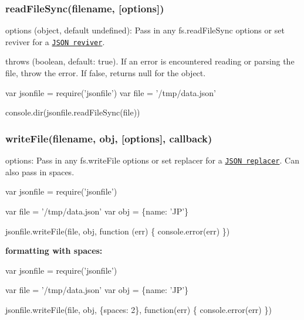 \subsubsection*{read\+File\+Sync(filename, \mbox{[}options\mbox{]})}

{\ttfamily options} ({\ttfamily object}, default {\ttfamily undefined})\+: Pass in any {\ttfamily fs.\+read\+File\+Sync} options or set {\ttfamily reviver} for a \href{https://developer.mozilla.org/en-US/docs/Web/JavaScript/Reference/Global_Objects/JSON/parse}{\tt J\+S\+ON reviver}.
\begin{DoxyItemize}
\item {\ttfamily throws} ({\ttfamily boolean}, default\+: {\ttfamily true}). If an error is encountered reading or parsing the file, throw the error. If {\ttfamily false}, returns {\ttfamily null} for the object.
\end{DoxyItemize}


\begin{DoxyCode}
var jsonfile = require('jsonfile')
var file = '/tmp/data.json'

console.dir(jsonfile.readFileSync(file))
\end{DoxyCode}


\subsubsection*{write\+File(filename, obj, \mbox{[}options\mbox{]}, callback)}

{\ttfamily options}\+: Pass in any {\ttfamily fs.\+write\+File} options or set {\ttfamily replacer} for a \href{https://developer.mozilla.org/en-US/docs/Web/JavaScript/Reference/Global_Objects/JSON/stringify}{\tt J\+S\+ON replacer}. Can also pass in {\ttfamily spaces}.


\begin{DoxyCode}
var jsonfile = require('jsonfile')

var file = '/tmp/data.json'
var obj = \{name: 'JP'\}

jsonfile.writeFile(file, obj, function (err) \{
  console.error(err)
\})
\end{DoxyCode}


{\bfseries formatting with spaces\+:}


\begin{DoxyCode}
var jsonfile = require('jsonfile')

var file = '/tmp/data.json'
var obj = \{name: 'JP'\}

jsonfile.writeFile(file, obj, \{spaces: 2\}, function(err) \{
  console.error(err)
\})
\end{DoxyCode}


